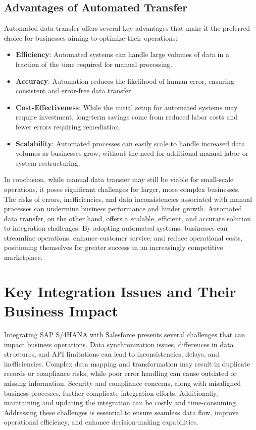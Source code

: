 \subsection{Advantages of Automated Transfer}

Automated data transfer offers several key advantages that make it the preferred choice for businesses aiming to optimize their operations:

\begin{itemize}
    \item \textbf{Efficiency}: Automated systems can handle large volumes of data in a fraction of the time required for manual processing.
    \item \textbf{Accuracy}: Automation reduces the likelihood of human error, ensuring consistent and error-free data transfer.
    \item \textbf{Cost-Effectiveness}: While the initial setup for automated systems may require investment, long-term savings come from reduced labor costs and fewer errors requiring remediation.
    \item \textbf{Scalability}: Automated processes can easily scale to handle increased data volumes as businesses grow, without the need for additional manual labor or system restructuring.
\end{itemize}

In conclusion, while manual data transfer may still be viable for small-scale operations, it poses significant challenges for larger, more complex businesses. The risks of errors, inefficiencies, and data inconsistencies associated with manual processes can undermine business performance and hinder growth. Automated data transfer, on the other hand, offers a scalable, efficient, and accurate solution to integration challenges. By adopting automated systems, businesses can streamline operations, enhance customer service, and reduce operational costs, positioning themselves for greater success in an increasingly competitive marketplace.

\section{Key Integration Issues and Their Business Impact}

Integrating SAP S/4HANA with Salesforce presents several challenges that can impact business operations. Data synchronization issues, differences in data structures, and API limitations can lead to inconsistencies, delays, and inefficiencies. Complex data mapping and transformation may result in duplicate records or compliance risks, while poor error handling can cause outdated or missing information. Security and compliance concerns, along with misaligned business processes, further complicate integration efforts. Additionally, maintaining and updating the integration can be costly and time-consuming. Addressing these challenges is essential to ensure seamless data flow, improve operational efficiency, and enhance decision-making capabilities.

